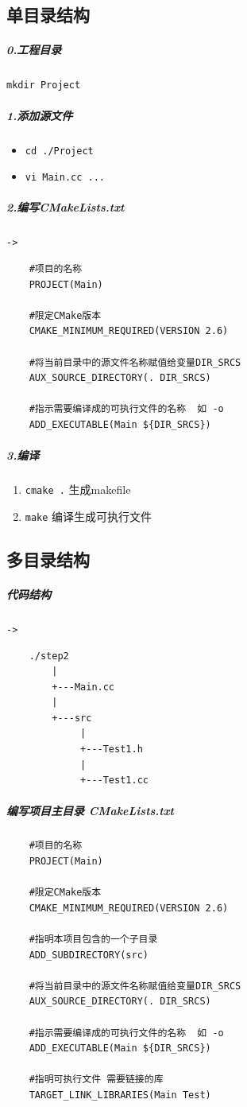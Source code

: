 \documentclass[UTF8,a4paper,8pt]{ctexbook}
\begin{document}
		\subsection{单目录结构}
			\subparagraph{0.工程目录}
				\verb|mkdir Project|
			\subparagraph{1.添加源文件}
				\begin{itemize}[itemindent = 2em]
					\item \verb|cd ./Project|
					\item \verb|vi Main.cc ...|
				\end{itemize}
				
			\subparagraph{2.编写CMakeLists.txt}\verb|-> |
				\begin{lstlisting}
	#项目的名称
	PROJECT(Main)
	
	#限定CMake版本
	CMAKE_MINIMUM_REQUIRED(VERSION 2.6)
	
	#将当前目录中的源文件名称赋值给变量DIR_SRCS
	AUX_SOURCE_DIRECTORY(. DIR_SRCS)
	
	#指示需要编译成的可执行文件的名称  如 -o
	ADD_EXECUTABLE(Main ${DIR_SRCS})
				\end{lstlisting}
			\subparagraph{3.编译}
				\begin{enumerate}[itemindent = 2em]
					\item \verb|cmake .| 生成makefile
					\item \verb|make| 编译生成可执行文件
				\end{enumerate}
				
		\subsection{多目录结构}
			\subparagraph{代码结构}\verb|-> |
				\begin{lstlisting}
	./step2
		|
		+---Main.cc
		|
		+---src
			 |
			 +---Test1.h
			 |
			 +---Test1.cc
				\end{lstlisting}
				
			\subparagraph{编写项目主目录 CMakeLists.txt}
				\begin{lstlisting}
	#项目的名称
	PROJECT(Main)
	
	#限定CMake版本
	CMAKE_MINIMUM_REQUIRED(VERSION 2.6)
	
	#指明本项目包含的一个子目录
	ADD_SUBDIRECTORY(src)
	
	#将当前目录中的源文件名称赋值给变量DIR_SRCS
	AUX_SOURCE_DIRECTORY(. DIR_SRCS)
	
	#指示需要编译成的可执行文件的名称  如 -o
	ADD_EXECUTABLE(Main ${DIR_SRCS})
	
	#指明可执行文件 需要链接的库
	TARGET_LINK_LIBRARIES(Main Test)
				\end{lstlisting}
			
\end{document}
